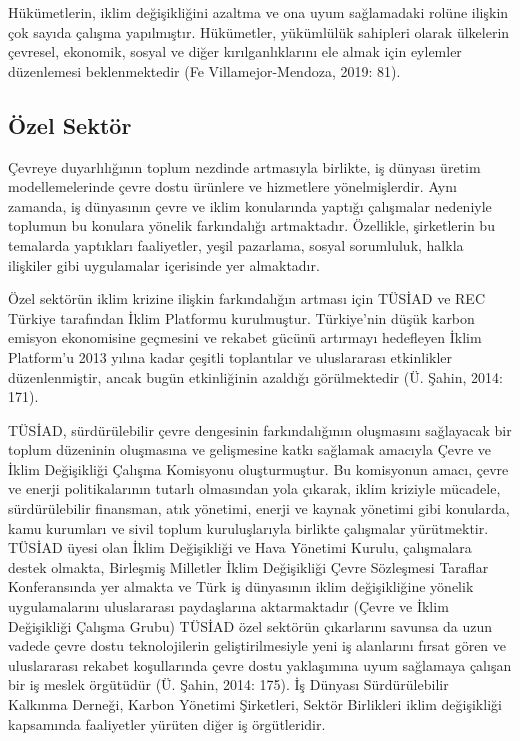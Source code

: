 \documentclass[
]{book}
\begin{document}
Hükümetlerin, iklim değişikliğini azaltma ve ona uyum sağlamadaki rolüne ilişkin çok sayıda çalışma yapılmıştır. Hükümetler, yükümlülük sahipleri olarak ülkelerin çevresel, ekonomik, sosyal ve diğer kırılganlıklarını ele almak için eylemler düzenlemesi beklenmektedir (Fe Villamejor-Mendoza, 2019: 81).

\hypertarget{uxf6zel-sektuxf6r}{%
\subsection{Özel Sektör}\label{uxf6zel-sektuxf6r}}

Çevreye duyarlılığının toplum nezdinde artmasıyla birlikte, iş dünyası üretim modellemelerinde çevre dostu ürünlere ve hizmetlere yönelmişlerdir. Aynı zamanda, iş dünyasının çevre ve iklim konularında yaptığı çalışmalar nedeniyle toplumun bu konulara yönelik farkındalığı artmaktadır. Özellikle, şirketlerin bu temalarda yaptıkları faaliyetler, yeşil pazarlama, sosyal sorumluluk, halkla ilişkiler gibi uygulamalar içerisinde yer almaktadır.

Özel sektörün iklim krizine ilişkin farkındalığın artması için TÜSİAD ve REC Türkiye tarafından İklim Platformu kurulmuştur. Türkiye'nin düşük karbon emisyon ekonomisine geçmesini ve rekabet gücünü artırmayı hedefleyen İklim Platform'u 2013 yılına kadar çeşitli toplantılar ve uluslararası etkinlikler düzenlenmiştir, ancak bugün etkinliğinin azaldığı görülmektedir (Ü. Şahin, 2014: 171).

TÜSİAD, sürdürülebilir çevre dengesinin farkındalığının oluşmasını sağlayacak bir toplum düzeninin oluşmasına ve gelişmesine katkı sağlamak amacıyla Çevre ve İklim Değişikliği Çalışma Komisyonu oluşturmuştur. Bu komisyonun amacı, çevre ve enerji politikalarının tutarlı olmasından yola çıkarak, iklim kriziyle mücadele, sürdürülebilir finansman, atık yönetimi, enerji ve kaynak yönetimi gibi konularda, kamu kurumları ve sivil toplum kuruluşlarıyla birlikte çalışmalar yürütmektir. TÜSİAD üyesi olan İklim Değişikliği ve Hava Yönetimi Kurulu, çalışmalara destek olmakta, Birleşmiş Milletler İklim Değişikliği Çevre Sözleşmesi Taraflar Konferansında yer almakta ve Türk iş dünyasının iklim değişikliğine yönelik uygulamalarını uluslararası paydaşlarına aktarmaktadır (Çevre ve İklim Değişikliği Çalışma Grubu) TÜSİAD özel sektörün çıkarlarını savunsa da uzun vadede çevre dostu teknolojilerin geliştirilmesiyle yeni iş alanlarını fırsat gören ve uluslararası rekabet koşullarında çevre dostu yaklaşımına uyum sağlamaya çalışan bir iş meslek örgütüdür (Ü. Şahin, 2014: 175). İş Dünyası Sürdürülebilir Kalkınma Derneği, Karbon Yönetimi Şirketleri, Sektör Birlikleri iklim değişikliği kapsamında faaliyetler yürüten diğer iş örgütleridir.
\end{document}
